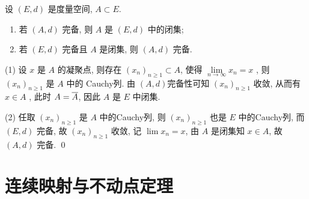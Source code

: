 \begin{Theorem}
	设 $ (E, d) $ 是度量空间, $ A\subset E $.
	\begin{enumerate}[(1)]
		\item 若 $ (A, d) $ 完备, 则 $ A $ 是 $ (E, d) $ 中的闭集;
		\item 若 $ (E, d) $ 完备且 $ A $ 是闭集, 则 $ (A, d) $ 完备.
	\end{enumerate}
\end{Theorem}
\begin{Proof}
	(1) 设 $ x $ 是 $ A $ 的凝聚点, 则存在 $ (x_{n})_{n\geqslant1}\subset A $, 使得 $ \lim\limits_{n\to\infty}x_{n}=x $ , 则 $ (x_{n})_{n\geqslant1} $ 是 $ A $ 中的 Cauchy列. 由 $ (A, d) $完备性可知 $ (x_{n})_{n\geqslant1} $ 收敛, 从而有 $ x\in A $ , 此时 $ A=\baro{A} $, 因此 $ A $ 是 $ E $ 中闭集.

	(2) 任取 $ (x_{n})_{n\geqslant1} $ 是 $ A $ 中的Cauchy列, 则 $ (x_{n})_{n\geqslant1} $ 也是 $ E $ 中的Cauchy列, 而 $ (E, d) $ 完备, 故 $ (x_{n})_{n\geqslant1} $ 收敛, 记 $ \lim\limits x_{n}=x $, 由 $ A $ 是闭集知 $ x\in A $, 故 $ (A, d) $ 完备. \qed
\end{Proof}
\section{连续映射与不动点定理}
